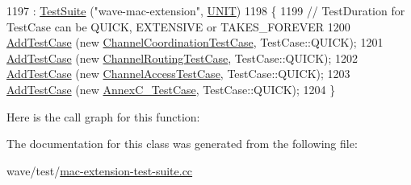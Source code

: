 \begin{DoxyCode}
1197   : \hyperlink{classns3_1_1TestSuite_a904b0c40583b744d30908aeb94636d1a}{TestSuite} (\textcolor{stringliteral}{"wave-mac-extension"}, \hyperlink{classns3_1_1TestSuite_a1ebfcab34ec8161e085e8e3a1855eae0a3885375a3787abf60431f8454b3cadbd}{UNIT})
1198 \{
1199   \textcolor{comment}{// TestDuration for TestCase can be QUICK, EXTENSIVE or TAKES\_FOREVER}
1200   \hyperlink{classns3_1_1TestCase_a3718088e3eefd5d6454569d2e0ddd835}{AddTestCase} (\textcolor{keyword}{new} \hyperlink{classChannelCoordinationTestCase}{ChannelCoordinationTestCase}, TestCase::QUICK);
1201   \hyperlink{classns3_1_1TestCase_a3718088e3eefd5d6454569d2e0ddd835}{AddTestCase} (\textcolor{keyword}{new} \hyperlink{classChannelRoutingTestCase}{ChannelRoutingTestCase}, TestCase::QUICK);
1202   \hyperlink{classns3_1_1TestCase_a3718088e3eefd5d6454569d2e0ddd835}{AddTestCase} (\textcolor{keyword}{new} \hyperlink{classChannelAccessTestCase}{ChannelAccessTestCase}, TestCase::QUICK);
1203   \hyperlink{classns3_1_1TestCase_a3718088e3eefd5d6454569d2e0ddd835}{AddTestCase} (\textcolor{keyword}{new} \hyperlink{classAnnexC__TestCase}{AnnexC\_TestCase}, TestCase::QUICK);
1204 \}
\end{DoxyCode}


Here is the call graph for this function\+:




The documentation for this class was generated from the following file\+:\begin{DoxyCompactItemize}
\item 
wave/test/\hyperlink{mac-extension-test-suite_8cc}{mac-\/extension-\/test-\/suite.\+cc}\end{DoxyCompactItemize}
